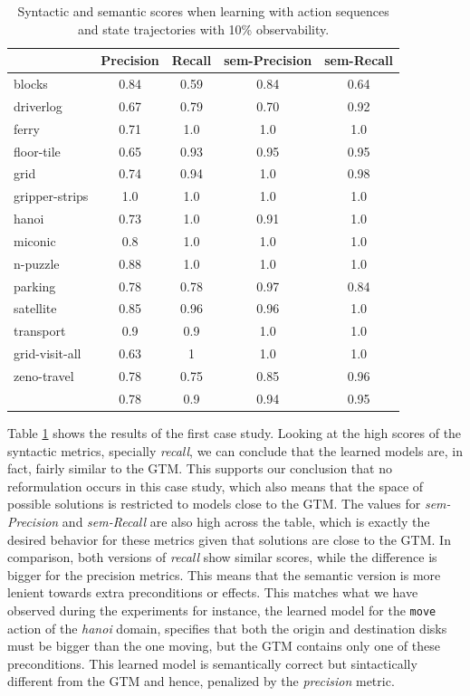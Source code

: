 \begin{table}[hbt!]
     \begin{footnotesize}
	\begin{center}		
		\begin{tabular}{l|c|c|c|c|}		
			& {\bf Precision} & {\bf Recall} & {\bf sem-Precision} & {\bf sem-Recall} \\
			\hline
			blocks & 0.84 & 0.59 & 0.84 & 0.64 \\
			driverlog & 0.67 & 0.79 & 0.70 & 0.92 \\
			ferry & 0.71 & 1.0 & 1.0 & 1.0 \\
			floor-tile & 0.65 & 0.93 & 0.95 & 0.95 \\
			grid & 0.74 & 0.94 & 1.0 & 0.98 \\
			gripper-strips & 1.0 & 1.0 & 1.0 & 1.0 \\
			hanoi & 0.73 & 1.0 & 0.91 & 1.0 \\
			miconic & 0.8 & 1.0	& 1.0 & 1.0 \\
			n-puzzle & 0.88 & 1.0 & 1.0 & 1.0 \\
			parking & 0.78 & 0.78 & 0.97 & 0.84 \\
			satellite & 0.85 & 0.96 & 0.96 & 1.0 \\
			transport & 0.9 & 0.9 & 1.0 & 1.0 \\
			grid-visit-all & 0.63 & 1 & 1.0 & 1.0 \\
			zeno-travel & 0.78 & 0.75 & 0.85 & 0.96 \\
			\hline
			& 0.78 & 0.9 & 0.94 & 0.95
		\end{tabular}
	\end{center}
     \end{footnotesize}
     \caption{\small Syntactic and semantic scores when learning with \FO action sequences and \PO state trajectories with 10\% observability.}
     \label{tab:metric_comparison_100_10}
\end{table}

Table \ref{tab:metric_comparison_100_10} shows the results of the first case study. Looking at the high scores of the syntactic metrics, specially {\em recall}, we can conclude that the learned models are, in fact, fairly similar to the GTM. This supports our conclusion that no reformulation occurs in this case study, which also means that the space of possible solutions is restricted to models close to the GTM. The values for {\em sem-Precision} and {\em sem-Recall} are also high across the table, which is exactly the desired behavior for these metrics given that solutions are close to the GTM. In comparison, both versions of {\em recall} show similar scores, while the difference is bigger for the precision metrics. This means that the semantic version is more lenient towards extra preconditions or effects. This matches what we have observed during the experiments for instance, the learned model for the {\tt move} action of the {\em hanoi} domain, specifies that both the origin and destination disks must be bigger than the one moving, but the GTM contains only one of these preconditions. This learned model is semantically correct but sintactically different from the GTM and hence, penalized by the {\em precision} metric. 

